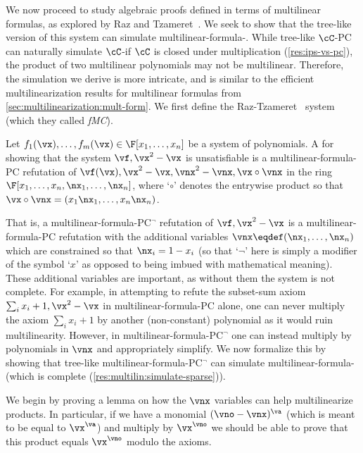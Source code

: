\documentclass{toc}
\begin{document}
We now proceed to study algebraic proofs defined in terms of multilinear formulas, as explored by Raz and Tzameret~\cite{RazTzameret08a,RazTzameret08b}.  We seek to show that the tree-like version of this system can simulate multilinear-formula-\lIPS.  While tree-like $\cC$-PC can naturally simulate $\cC$-\lIPS if $\cC$ is closed under multiplication (\autoref{res:ips-vs-pc}), the product of two multilinear polynomials may not be multilinear.
Therefore, %
the simulation we derive is more intricate, and is similar to the efficient multilinearization results for multilinear formulas from \autoref{sec:multilinearization:mult-form}. We first define the Raz-Tzameret~\cite{RazTzameret08a,RazTzameret08b}  system (which they called \emph{fMC}).

\begin{definition}\label{defn:pc:multlin}
        Let $f_1(\vx),\ldots,f_m(\vx)\in\F[x_1,\ldots,x_n]$ be a system of polynomials. A  for showing that the system $\vf,\vx^2-\vx$ is unsatisfiable is a multilinear-formula-PC refutation of $\vf(\vx),\vx^2-\vx,\vnx^2-\vnx,\vx\circ\vnx$ in the ring $\F[x_1,\ldots,x_n,\nx_1,\ldots,\nx_n]$, where `$\circ$' denotes the
%
entrywise  %
product so that $\vx\circ\vnx=(x_1\nx_1,\ldots,x_n\nx_n)$.
\end{definition}

That is, a multilinear-formula-PC$^\neg$ refutation of $\vf,\vx^2-\vx$ is a multilinear-formula-PC refutation with the additional variables $\vnx\eqdef(\nx_1,\ldots,\nx_n)$ which are constrained so that $\nx_i=1-x_i$ (so that `$\neg$' here is simply a modifier of the symbol `$x$' as opposed to being imbued with mathematical meaning).  These additional variables are important, as without them the system is not complete. For example, in attempting to refute the subset-sum axiom $\sum_i x_i+1,\vx^2-\vx$ in multilinear-formula-PC alone, one can never multiply the axiom $\sum_i x_i+1$ by another (non-constant) polynomial as it would ruin multilinearity.  However, in multilinear-formula-PC$^\neg$ one can instead multiply by polynomials in $\vnx$ and appropriately simplify.  We now formalize this by showing that tree-like multilinear-formula-PC$^\neg$ can simulate multilinear-formula-\lbIPS (which is complete (\autoref{res:multilin:simulate-sparse})).

We begin by proving a lemma on how the $\vnx$ variables can help multilinearize products.  In particular, if we have a monomial $(\vno-\vnx)^\va$ (which is meant to be equal to $\vx^\va$) and multiply by $\vx^\vno$ we should be able to prove that this product equals $\vx^\vno$ modulo the axioms.
\end{document}
